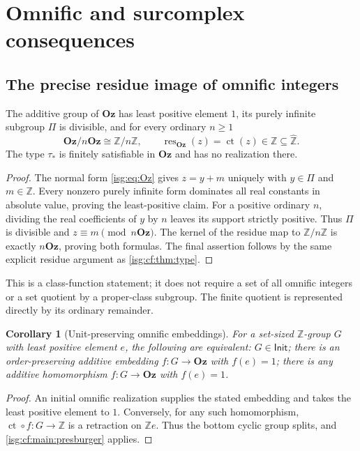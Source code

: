 \documentclass[11pt]{article}
\newtheorem{corollary}[corollary]{Corollary}
\theoremstyle{definition}
\theoremstyle{remark}
\newcommand{\Oz}{\ensuremath{\mathbf{Oz}}}
\newcommand{\Z}{\mathbb{Z}}
\newcommand{\ct}{\operatorname{ct}}
\newcommand{\Zhat}{\widehat{\Z}}
\newcommand{\IR}{\mathsf{Init}}
\newcommand{\res}{\operatorname{res}}
\begin{document}
\section{Omnific and surcomplex consequences}\label{isg:cf:sec:complex}

\subsection{The precise residue image of omnific integers}
\begin{proposition}\label{isg:cf:prop:omnificresidue}
The additive group of $\Oz$ has least positive element $1$, its purely
infinite subgroup $\Pi$ is divisible, and for every ordinary $n\ge1$
\[
 \Oz/n\Oz\cong\Z/n\Z,\qquad
 \res_{\Oz}(z)=\ct(z)\in\Z\subseteq\Zhat.
\]
The type $\tau_*$ is finitely satisfiable in $\Oz$ and has no realization
there.
\end{proposition}
\begin{proof}
The normal form \eqref{isg:eq:Oz} gives $z=y+m$ uniquely with
$y\in\Pi$ and $m\in\Z$. Every nonzero purely infinite form dominates
all real constants in absolute value, proving the least-positive claim.
For a positive ordinary $n$, dividing the real coefficients of $y$ by
$n$ leaves its support strictly positive. Thus $\Pi$ is divisible and
$z\equiv m\pmod{n\Oz}$. The kernel of the residue map to $\Z/n\Z$
is exactly $n\Oz$, proving both formulas. The final assertion follows
by the same explicit residue argument as \cref{isg:cf:thm:type}.
\end{proof}

This is a class-function statement; it does not require a set of all
omnific integers or a set quotient by a proper-class subgroup. The
finite quotient is represented directly by its ordinary remainder.

\begin{corollary}[Unit-preserving omnific embeddings]\label{isg:cf:cor:unit}
For a set-sized $\Z$-group $G$ with least positive element $e$, the
following are equivalent: $G\in\IR$; there is an order-preserving
additive embedding $f:G\to\Oz$ with $f(e)=1$; there is any additive
homomorphism $f:G\to\Oz$ with $f(e)=1$.
\end{corollary}
\begin{proof}
An initial omnific realization supplies the stated embedding and takes
the least positive element to $1$. Conversely, for any such homomorphism,
$\ct\circ f:G\to\Z$ is a retraction on $\Z e$. Thus the bottom cyclic
group splits, and \cref{isg:cf:main:presburger} applies.
\end{proof}
\end{document}

